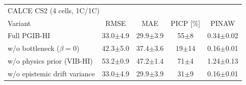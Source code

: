 \begin{tabular}{l c c c c}
\hline
\multicolumn{5}{l}{CALCE CS2 (4 cells, 1C/1C)}\\
 Variant & RMSE & MAE & PICP [\%] & PINAW \\
\hline
Full PGIB-HI & 33.0$\pm$4.9 & 29.9$\pm$3.9 & 55$\pm$8 & 0.34$\pm$0.02 \\
w/o bottleneck ($\beta=0$) & 42.3$\pm$5.0 & 37.4$\pm$3.6 & 19$\pm$14 & 0.16$\pm$0.01 \\
w/o physics prior (VIB-HI) & 53.2$\pm$0.9 & 47.2$\pm$1.4 & 71$\pm$4 & 1.24$\pm$0.13 \\
w/o epistemic drift variance & 33.0$\pm$4.9 & 29.9$\pm$3.9 & 31$\pm$9 & 0.16$\pm$0.01 \\
\hline
\end{tabular}
